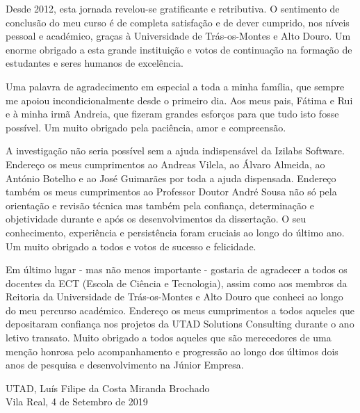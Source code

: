 \hspace{1cm}Desde 2012, esta jornada revelou-se gratificante e retributiva. O sentimento de conclusão do meu curso é de completa satisfação e de dever cumprido, nos níveis pessoal e académico, graças à Universidade de Trás-os-Montes e Alto Douro. Um enorme obrigado a esta grande instituição e votos de continuação na formação de estudantes e seres humanos de excelência.

\hspace{1cm}Uma palavra de agradecimento em especial a toda a minha família, que sempre me apoiou incondicionalmente desde o primeiro dia. Aos meus pais, Fátima e Rui e à minha irmã Andreia, que fizeram grandes esforços para que tudo isto fosse possível. Um muito obrigado pela paciência, amor e compreensão.

\hspace{1cm}A investigação não seria possível sem a ajuda indispensável da Izilabs Software. Endereço os meus cumprimentos ao Andreas Vilela, ao Álvaro Almeida, ao António Botelho e ao José Guimarães por toda a ajuda dispensada. Endereço também os meus cumprimentos ao Professor Doutor André Sousa não só pela orientação e revisão técnica mas também pela confiança, determinação e objetividade durante e após os desenvolvimentos da dissertação. O seu conhecimento, experiência e persistência foram cruciais ao longo do último ano. Um muito obrigado a todos e votos de sucesso e felicidade.

\hspace{1cm}Em último lugar - mas não menos importante - gostaria de agradecer a todos os docentes da ECT (Escola de Ciência e Tecnologia), assim como aos membros da Reitoria da Universidade de Trás-os-Montes e Alto Douro que conheci ao longo do meu percurso académico. Endereço os meus cumprimentos a todos aqueles que depositaram confiança nos projetos da UTAD Solutions Consulting durante o ano letivo transato. Muito obrigado a todos aqueles que são merecedores de uma menção honrosa pelo acompanhamento e progressão ao longo dos últimos dois anos de pesquisa e desenvolvimento na Júnior Empresa.

\EspacoMedio
\EspacoMedio
\EspacoMedio
\noindent UTAD, \hfill Luís Filipe da Costa Miranda Brochado \\ Vila Real, 4 de Setembro de 2019

